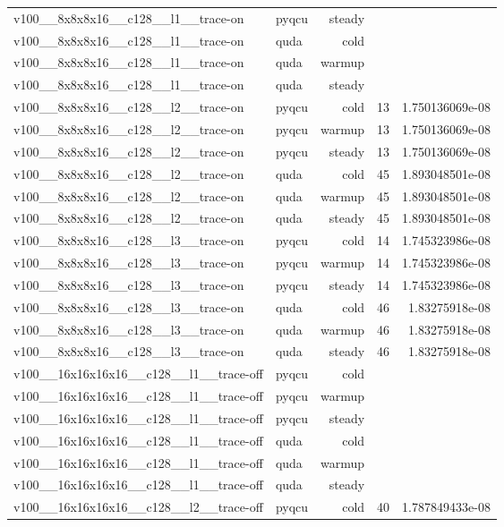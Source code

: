 \begin{table}[htbp]
\begin{tabular}{@{}llrrr@{}}
v100\_\_8x8x8x16\_\_c128\_\_l1\_\_trace-on & pyqcu & steady &  &  \\
v100\_\_8x8x8x16\_\_c128\_\_l1\_\_trace-on & quda & cold &  &  \\
v100\_\_8x8x8x16\_\_c128\_\_l1\_\_trace-on & quda & warmup &  &  \\
v100\_\_8x8x8x16\_\_c128\_\_l1\_\_trace-on & quda & steady &  &  \\
v100\_\_8x8x8x16\_\_c128\_\_l2\_\_trace-on & pyqcu & cold & 13 & 1.750136069e-08 \\
v100\_\_8x8x8x16\_\_c128\_\_l2\_\_trace-on & pyqcu & warmup & 13 & 1.750136069e-08 \\
v100\_\_8x8x8x16\_\_c128\_\_l2\_\_trace-on & pyqcu & steady & 13 & 1.750136069e-08 \\
v100\_\_8x8x8x16\_\_c128\_\_l2\_\_trace-on & quda & cold & 45 & 1.893048501e-08 \\
v100\_\_8x8x8x16\_\_c128\_\_l2\_\_trace-on & quda & warmup & 45 & 1.893048501e-08 \\
v100\_\_8x8x8x16\_\_c128\_\_l2\_\_trace-on & quda & steady & 45 & 1.893048501e-08 \\
v100\_\_8x8x8x16\_\_c128\_\_l3\_\_trace-on & pyqcu & cold & 14 & 1.745323986e-08 \\
v100\_\_8x8x8x16\_\_c128\_\_l3\_\_trace-on & pyqcu & warmup & 14 & 1.745323986e-08 \\
v100\_\_8x8x8x16\_\_c128\_\_l3\_\_trace-on & pyqcu & steady & 14 & 1.745323986e-08 \\
v100\_\_8x8x8x16\_\_c128\_\_l3\_\_trace-on & quda & cold & 46 & 1.83275918e-08 \\
v100\_\_8x8x8x16\_\_c128\_\_l3\_\_trace-on & quda & warmup & 46 & 1.83275918e-08 \\
v100\_\_8x8x8x16\_\_c128\_\_l3\_\_trace-on & quda & steady & 46 & 1.83275918e-08 \\
v100\_\_16x16x16x16\_\_c128\_\_l1\_\_trace-off & pyqcu & cold &  &  \\
v100\_\_16x16x16x16\_\_c128\_\_l1\_\_trace-off & pyqcu & warmup &  &  \\
v100\_\_16x16x16x16\_\_c128\_\_l1\_\_trace-off & pyqcu & steady &  &  \\
v100\_\_16x16x16x16\_\_c128\_\_l1\_\_trace-off & quda & cold &  &  \\
v100\_\_16x16x16x16\_\_c128\_\_l1\_\_trace-off & quda & warmup &  &  \\
v100\_\_16x16x16x16\_\_c128\_\_l1\_\_trace-off & quda & steady &  &  \\
v100\_\_16x16x16x16\_\_c128\_\_l2\_\_trace-off & pyqcu & cold & 40 & 1.787849433e-08 \\

\end{tabular}
\end{table}
